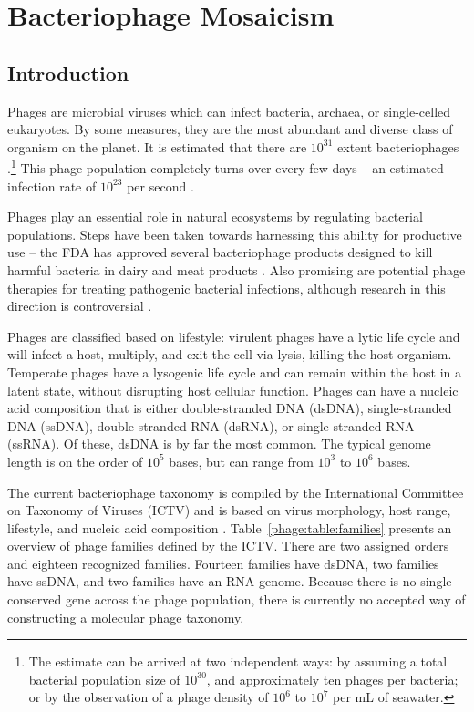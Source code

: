 \chapter{Bacteriophage Mosaicism}
\label{ch:phage}

\section{Introduction}
\label{phage:introduction}

Phages are microbial viruses which can infect bacteria, archaea, or single-celled eukaryotes.
By some measures, they are the most abundant and diverse class of organism on the planet.
It is estimated that there are $10^31$ extent bacteriophages \cite{Rohwer:2014vz}.\footnote{The estimate can be arrived at two independent ways: by assuming a total bacterial population size of $10^30$, and approximately ten phages per bacteria; or by the observation of a phage density of $10^6$ to $10^7$ per mL of seawater.}
This phage population completely turns over every few days -- an estimated infection rate of $10^23$ per second \cite{Suttle:2007cj}.

Phages play an essential role in natural ecosystems by regulating bacterial populations.
Steps have been taken towards harnessing this ability for productive use -- the FDA has approved several bacteriophage products designed to kill harmful bacteria in dairy and meat products \cite{Bren:2007wn}.
Also promising are potential phage therapies for treating pathogenic bacterial infections, although research in this direction is controversial \cite{Keen:2012du}.

Phages are classified based on lifestyle: virulent phages have a lytic life cycle and will infect a host, multiply, and exit the cell via lysis, killing the host organism. Temperate phages have a lysogenic life cycle and can remain within the host in a latent state, without disrupting host cellular function.
Phages can have a nucleic acid composition that is either double-stranded DNA (dsDNA), single-stranded DNA (ssDNA), double-stranded RNA (dsRNA), or single-stranded RNA (ssRNA).
Of these, dsDNA is by far the most common.
The typical genome length is on the order of $10^5$ bases, but can range from $10^3$ to $10^6$ bases.

The current bacteriophage taxonomy is compiled by the International Committee on Taxonomy of Viruses (ICTV) and is based on virus morphology, host range, lifestyle, and nucleic acid composition \cite{ICTV:2012}.
Table~\ref{phage:table:families} presents an overview of phage families defined by the ICTV.
There are two assigned orders and eighteen recognized families.
Fourteen families have dsDNA, two families have ssDNA, and two families have an RNA genome.
Because there is no single conserved gene across the phage population, there is currently no accepted way of constructing a molecular phage taxonomy.

